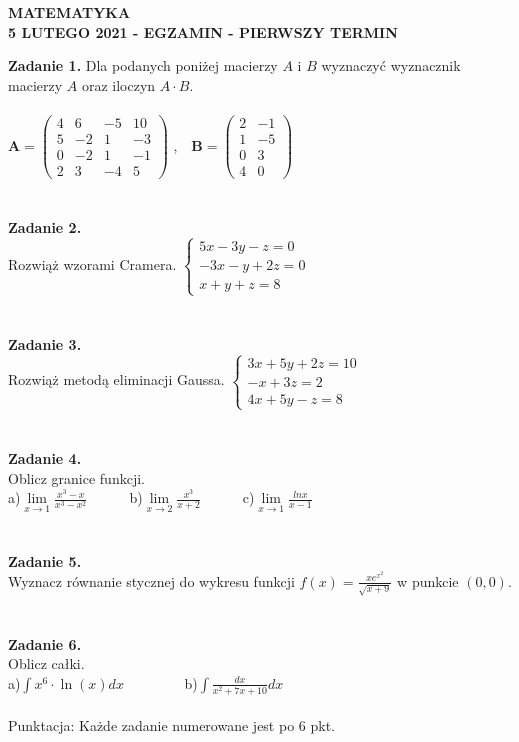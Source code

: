 \documentclass[12pt,a4paper]{report}
\begin{document}
\begin{center}

\textbf{MATEMATYKA \\5 LUTEGO 2021 - EGZAMIN - PIERWSZY TERMIN}

\end{center}\textbf{Zadanie 1.} Dla podanych poniżej macierzy $A$ i $B$ wyznaczyć wyznacznik macierzy $A$ oraz iloczyn $A\cdot B$. \\\\ $ \mathbf{A} = \left( \begin{array}{cccc} 4 & 6& -5 & 10\\5 & -2& 1 & -3\\0 & -2& 1 & -1\\2 & 3 & -4 & 5 \end{array} \right)$ ,\ \ $\mathbf{B} =\left( \begin{array}{cccc}2 & -1\\1 & -5\\0 & 3\\4 & 0  \end{array} \right)$\\\\\\\textbf{Zadanie 2.} \\Rozwiąż wzorami Cramera. $\left\{ \begin{array}{ll}5x-3y-z=0\\-3x-y+2z=0\\x+y+z=8\end{array} \right.$\\\\\\\textbf{Zadanie 3.} \\Rozwiąż metodą eliminacji Gaussa. $\left\{ \begin{array}{ll}3x+5y+2z=10\\-x+3z=2\\4x+5y-z=8\end{array} \right.$\\\\\\\textbf{Zadanie 4.}\\Oblicz granice funkcji.\\a)$\lim\limits_{x\to 1}\frac{x^3-x}{x^3-x^2}$\ \ \ \ \ \  b)$\lim\limits_{x\to 2}\frac{x^3}{x+2}$\ \ \ \ \ \ c)$\lim\limits_{x\to 1} \frac{lnx}{x-1}$\\\\\\\textbf{Zadanie 5.} \\Wyznacz równanie stycznej do wykresu funkcji $f(x)=\frac{xe^{x^2}}{\sqrt{x+9}}$ w punkcie $(0,0)$.\\\\\\\textbf{Zadanie 6.}\\Oblicz całki. \\a)$\int x^6\cdot \ln(x) dx$ \ \ \ \ \ \ \ \ b)$\int \frac{dx}{x^2+7x+10} dx$\\\\Punktacja: Każde zadanie numerowane jest po 6 pkt.
\end{document}
